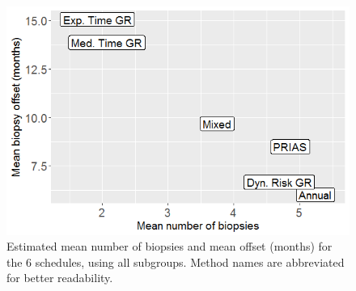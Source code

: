 \begin{figure}
\centerline{\includegraphics[width=\columnwidth]{images/sim_study/meanNbVsOffset_all.png}}
\caption{Estimated mean number of biopsies and mean offset (months) for the 6 schedules, using all subgroups. Method names are abbreviated for better readability.}
\label{fig : meanNbVsOffset}
\end{figure}

